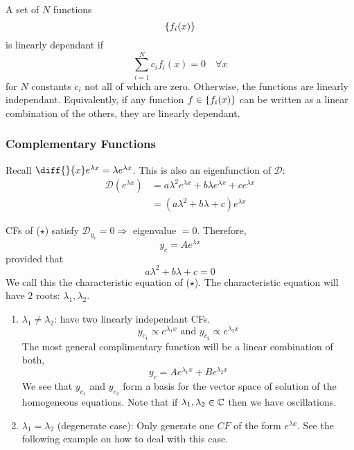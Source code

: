\documentclass{article}
\begin{document}
\begin{defi}
    A set of $N$ functions
    \[
        \left\{ f_i(x) \right\}
    \]
    is linearly dependant if
    \[
        \sum_{i=1}^{N} c_i f_i(x) = 0 \quad \forall x
    \]
    for $N$ constants $c_i$ not all of which are zero.
    Otherwise, the functions are linearly independant.
    Equivalently, if any function $f \in \left\{ f_i(x) \right\}$ can be written as a linear combination of the others, 
    they are linearly dependant.
\end{defi}
\subsubsection{Complementary Functions}
Recall $\diff {}{x} e^{\lambda x} = \lambda e^{\lambda x}$.
This is also an eigenfunction of $\mathcal{D}$:
\begin{align*}
    \mathcal{D}(e^{\lambda x}) &= a \lambda^2 e^{\lambda x} + b \lambda e^{\lambda x} + c e^{\lambda x}\\
    &= (a \lambda^2 + b \lambda + c)e^{\lambda x}
\end{align*}

CFs of ($\star$) satisfy $\mathcal{D}_{y_c} = 0 \Rightarrow$ eigenvalue $=0$.
Therefore, 
\[
    y_c = A e^{\lambda x}    
\]
provided that
\[
    a \lambda^2 + b \lambda + c = 0
\]
We call this the characteristic equation of ($\star$). The characteristic equation will have $2$ roots: $\lambda_1, \lambda_2$.

\begin{enumerate}[cases]
    \item $\lambda_1 \neq \lambda_2$: have two linearly independant CFs.
    \[
        y_{c_1} \propto e^{\lambda_1 x} \text{ and }  y_{c_2} \propto e^{\lambda_2 x}
    \]
    The most general complimentary function will be a linear combination of both,
    \[
        y_c = A e^{\lambda_1 x} + B e^{\lambda_2 x}
    \]
    We see that $y_{c_1}$ and $y_{c_2}$ form a basis for the vector space of solution of the homogeneous equations.
    Note that if $\lambda_1, \lambda_2 \in \mathbb{C}$ then we have oscillations.

    \item $\lambda_1 = \lambda_2$ (degenerate case): Only generate one $CF$ of the form $e^{\lambda x}$. 
    See the following example on how to deal with this case.
\end{enumerate}
\end{document}
